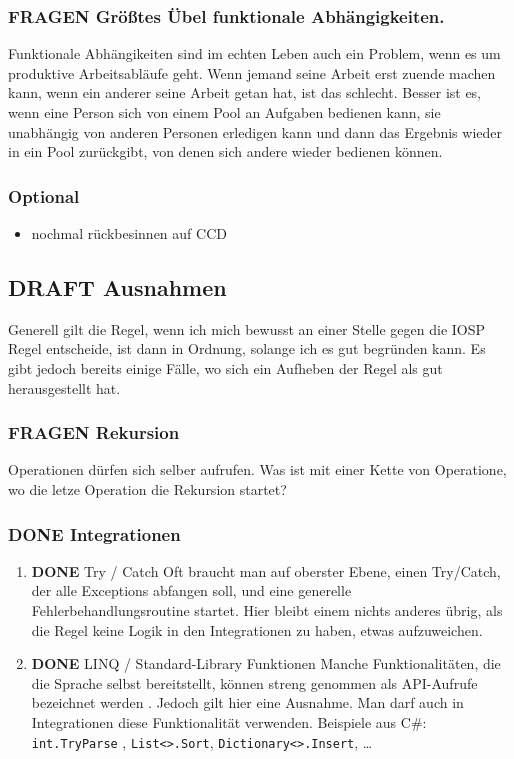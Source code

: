 \documentclass[11pt]{article}
\begin{document}
\subsubsection{{\bfseries\sffamily FRAGEN} Größtes Übel funktionale Abhängigkeiten.}
\label{sec:orgheadline63}
Funktionale Abhängikeiten sind im echten Leben auch ein Problem, wenn es um
produktive Arbeitsabläufe geht.
Wenn jemand seine Arbeit erst zuende machen kann, wenn ein anderer seine Arbeit
getan hat, ist das schlecht.
Besser ist es, wenn eine Person sich von einem Pool an Aufgaben bedienen kann,
sie unabhängig von anderen Personen erledigen kann und dann das Ergebnis wieder
in ein Pool zurückgibt, von denen sich andere wieder bedienen können.


\subsubsection{Optional}
\label{sec:orgheadline64}
\begin{itemize}
\item nochmal rückbesinnen auf CCD
\end{itemize}
\subsection{{\bfseries\sffamily DRAFT} Ausnahmen}
\label{sec:orgheadline70}
Generell gilt die Regel, wenn ich mich bewusst an einer Stelle gegen die IOSP
Regel entscheide, ist dann in Ordnung, solange ich es gut begründen kann.
Es gibt jedoch bereits einige Fälle, wo sich ein Aufheben der Regel als gut
herausgestellt hat.
\subsubsection{{\bfseries\sffamily FRAGEN} Rekursion}
\label{sec:orgheadline66}
Operationen dürfen sich selber aufrufen.
Was ist mit einer Kette von Operatione, wo die letze Operation die Rekursion startet?
\subsubsection{{\bfseries\sffamily DONE} Integrationen}
\label{sec:orgheadline69}
\begin{enumerate}
\item {\bfseries\sffamily DONE} Try / Catch
\label{sec:orgheadline67}
Oft braucht man auf oberster Ebene, einen Try/Catch, der alle Exceptions abfangen soll, und eine generelle Fehlerbehandlungsroutine
startet. Hier bleibt einem nichts anderes übrig, als die Regel keine Logik in den Integrationen zu haben, etwas aufzuweichen.

\item {\bfseries\sffamily DONE} LINQ / Standard-Library Funktionen
\label{sec:orgheadline68}
Manche Funktionalitäten, die die Sprache selbst bereitstellt, können streng genommen als API-Aufrufe bezeichnet werden
. Jedoch gilt hier eine Ausnahme. Man darf auch in Integrationen diese Funktionalität verwenden.
Beispiele aus C\#:
\texttt{int.TryParse} , \texttt{List<>.Sort}, \texttt{Dictionary<>.Insert}, \ldots{}
\end{enumerate}
\end{document}
